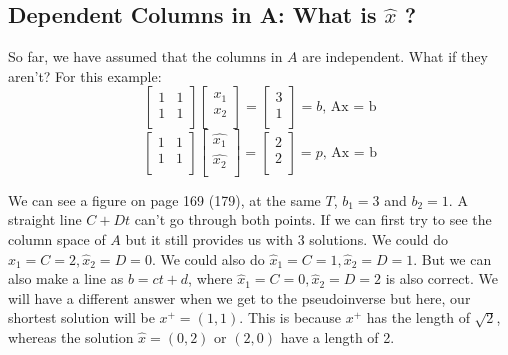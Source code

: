 \subsection{Dependent Columns in A: What is \(\hat{x}\) ?}

So far, we have assumed that the columns in \(A\) are independent. What if they aren't? For this example: 
\[
    \begin{bmatrix}
        1 & 1  \\
        1 & 1  \\
    \end{bmatrix}
    \begin{bmatrix}
         x_1 \\
         x_2 \\
    \end{bmatrix}
    = 
    \begin{bmatrix}
         3 \\
         1 \\
    \end{bmatrix}
    = b 
    \text{, Ax = b}
\] 
\[
    \begin{bmatrix}
        1 & 1  \\
        1 & 1  \\
    \end{bmatrix}
    \begin{bmatrix}
         \hat{x_1} \\
         \hat{x_2} \\
    \end{bmatrix}
    = 
    \begin{bmatrix}
         2 \\
         2 \\
    \end{bmatrix}
    = p
    \text{, Ax = b}
\] 

We can see a figure on page 169 (179), at the same \(T\), \(b_1 = 3\) and \(b_2 = 1\). A straight line \(C + Dt\) can't go through both points. If we can first try to see the column space of \(A\) but it still provides us with 3 solutions. We could do \(\hat{x}_1 = C = 2, \hat{x}_2 = D = 0\). We could also do \(\hat{x}_1 = C = 1, \hat{x}_2 = D = 1\). But we can also make a line as \(b = ct + d\), where \(\hat{x}_1 = C = 0, \hat{x}_2 = D = 2\) is also correct. We will have a different answer when we get to the pseudoinverse but here, our shortest solution will be \(x^+ = (1, 1)\). This is because \(x^+\) has the length of \(\sqrt{2} \), whereas the solution \(\hat{x} = (0, 2) \text{ or } (2, 0)\) have a length of 2. 

